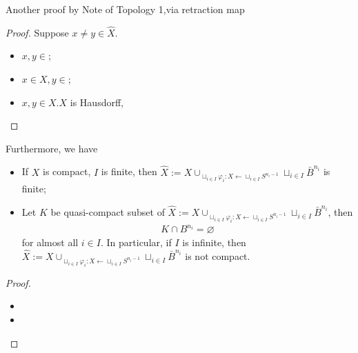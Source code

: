 \documentclass[Total.tex]{subfiles}
\begin{document}
	Another proof by Note of Topology 1,via retraction map
	\begin{proof}
		Suppose $x\not=y\in \hat{X}$. 
		\begin{itemize}
			\item $x,y\in $;
			\item $x\in X,y\in $;
			\item $x,y\in X$.$X$ is Hausdorff, 
		\end{itemize}
	\end{proof}
	
	Furthermore, we have
	\begin{proposition}
		\begin{itemize}
			\item If $X$ is compact, $I$ is finite, then $\hat{X}:=X\cup_{\sqcup_{i\in I} \varphi_i:X\leftarrow \sqcup_{i\in I} S^{n_i-1}}  \sqcup_{i\in I} \bar{B}^{n_i}$ is finite;
			\item Let $K$ be quasi-compact subset of $\hat{X}:=X\cup_{\sqcup_{i\in I} \varphi_i:X\leftarrow \sqcup_{i\in I} S^{n_i-1}}  \sqcup_{i\in I} \bar{B}^{n_i}$, then
			\begin{gather*}
				K\cap B^{n_i}=\varnothing
			\end{gather*}
			for almost all $i\in I$. In particular, if $I$ is infinite, then $\hat{X}:=X\cup_{\sqcup_{i\in I} \varphi_i:X\leftarrow \sqcup_{i\in I} S^{n_i-1}}  \sqcup_{i\in I} \bar{B}^{n_i}$ is not compact.
		\end{itemize}
	\end{proposition}
	\begin{proof}
		\begin{itemize}
			\item 
			\item 
		\end{itemize}
	\end{proof}
\end{document}
